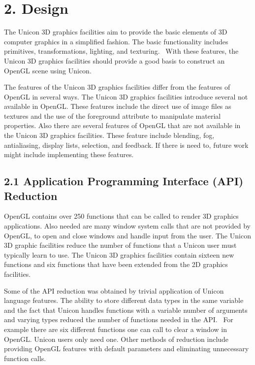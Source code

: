\documentclass[letterpaper]{article}
\begin{document}
\bigskip

\section[2. Design]{2. Design}

{
The Unicon 3D graphics facilities aim to provide the basic elements of 3D computer graphics in a simplified fashion. The
basic functionality includes primitives, transformations, lighting, and texturing. \ With these features, the Unicon 3D
graphics facilities should provide a good basis to construct an OpenGL scene using Unicon.}

{
The features of the Unicon 3D graphics facilities differ from the features of OpenGL in several ways. The Unicon 3D
graphics facilities introduce several not available in OpenGL. These features include the direct use of image files as
textures and the use of the foreground attribute to manipulate material properties. Also there are several features of
OpenGL that are not available in the Unicon 3D graphics facilities. These feature include blending, fog, antialiasing,
display lists, selection, and feedback. If there is need to, future work might include implementing these features. }

\subsection[2.1 Application Programming Interface (API)
Reduction]{\bfseries 2.1 Application Programming Interface (API) Reduction}

{
OpenGL contains over 250 functions that can be called to render 3D graphics applications. Also needed are many window
system calls that are not provided by OpenGL, to open and close windows and handle input from the user. The Unicon 3D
graphic facilities reduce the number of functions that a Unicon user must typically learn to use. The Unicon 3D
graphics facilities contain sixteen new functions and six functions that have been extended from the 2D graphics
facilities. }

{
Some of the API reduction was obtained by trivial application of Unicon language features. The ability to store
different data types in the same variable and the fact that Unicon handles functions with a variable number of
arguments and varying types reduced the number of functions needed in the API. \ For example there are six different
functions one can call to clear a window in OpenGL. Unicon users only need one. Other methods of reduction include
providing OpenGL features with default parameters and eliminating unnecessary function calls.}
\end{document}
